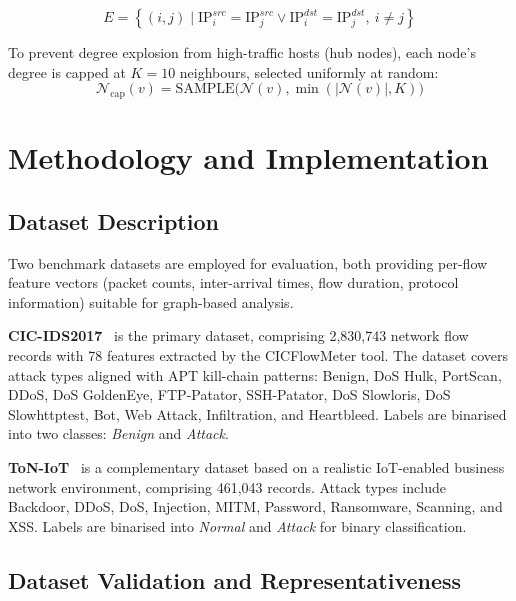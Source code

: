 \documentclass[conference]{IEEEtran}
\begin{document}
\begin{equation}
E = \left\{(i, j) \mid \text{IP}^{src}_i = \text{IP}^{src}_j \lor
\text{IP}^{dst}_i = \text{IP}^{dst}_j,\ i \neq j \right\}
\end{equation}

To prevent degree explosion from high-traffic hosts (hub nodes), each node's
degree is capped at $K = 10$ neighbours, selected uniformly at random:
\begin{equation}
\mathcal{N}_{\text{cap}}(v) = \text{SAMPLE}\bigl(\mathcal{N}(v),
\min(|\mathcal{N}(v)|, K)\bigr)
\end{equation}

\section{Methodology and Implementation}

\subsection{Dataset Description}

Two benchmark datasets are employed for evaluation, both providing per-flow
feature vectors (packet counts, inter-arrival times, flow duration, protocol
information) suitable for graph-based analysis.

\textbf{CIC-IDS2017}~\cite{sharafaldin2018} is the primary dataset, comprising
2,830,743 network flow records with 78 features extracted by the CICFlowMeter
tool. The dataset covers attack types aligned with APT kill-chain patterns:
Benign, DoS Hulk, PortScan, DDoS, DoS GoldenEye, FTP-Patator, SSH-Patator,
DoS Slowloris, DoS Slowhttptest, Bot, Web Attack, Infiltration, and Heartbleed.
Labels are binarised into two classes: \textit{Benign} and \textit{Attack}.

\textbf{ToN-IoT}~\cite{alsaedi2020} is a complementary dataset based on a realistic IoT-enabled
business network environment, comprising 461,043 records. Attack types include
Backdoor, DDoS, DoS, Injection, MITM, Password, Ransomware, Scanning, and XSS.
Labels are binarised into \textit{Normal} and \textit{Attack} for binary
classification.

\subsection{Dataset Validation and Representativeness}
\end{document}
